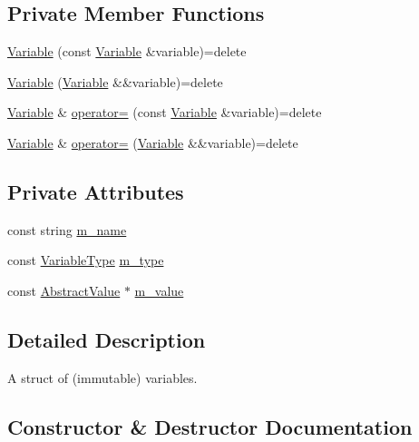 \subsection*{Private Member Functions}
\begin{DoxyCompactItemize}
\item 
\hyperlink{structmage_1_1_variable_a95b243cd65ea2f9be716545e6c4f4b8e}{Variable} (const \hyperlink{structmage_1_1_variable}{Variable} \&variable)=delete
\item 
\hyperlink{structmage_1_1_variable_afe6a57008273cc663ad62f31df824a97}{Variable} (\hyperlink{structmage_1_1_variable}{Variable} \&\&variable)=delete
\item 
\hyperlink{structmage_1_1_variable}{Variable} \& \hyperlink{structmage_1_1_variable_a99029d04b45f356b9681787fdab8a139}{operator=} (const \hyperlink{structmage_1_1_variable}{Variable} \&variable)=delete
\item 
\hyperlink{structmage_1_1_variable}{Variable} \& \hyperlink{structmage_1_1_variable_a3918cb719332c752205a805d0025a775}{operator=} (\hyperlink{structmage_1_1_variable}{Variable} \&\&variable)=delete
\end{DoxyCompactItemize}
\subsection*{Private Attributes}
\begin{DoxyCompactItemize}
\item 
const string \hyperlink{structmage_1_1_variable_afac262aa51bb1dfe447d501abcaa08d0}{m\+\_\+name}
\item 
const \hyperlink{namespacemage_a530428e73bac0ba7fe84b29086a9e33a}{Variable\+Type} \hyperlink{structmage_1_1_variable_acb45a61a0690e0efac614915595c4449}{m\+\_\+type}
\item 
const \hyperlink{structmage_1_1_variable_1_1_abstract_value}{Abstract\+Value} $\ast$ \hyperlink{structmage_1_1_variable_a99388f3fbccf983b8d6954fd31d0eb27}{m\+\_\+value}
\end{DoxyCompactItemize}


\subsection{Detailed Description}
A struct of (immutable) variables. 

\subsection{Constructor \& Destructor Documentation}
\hypertarget{structmage_1_1_variable_aefdee0e7bab3f1a18f0dc1cdc28429b6}{}\label{structmage_1_1_variable_aefdee0e7bab3f1a18f0dc1cdc28429b6} 

